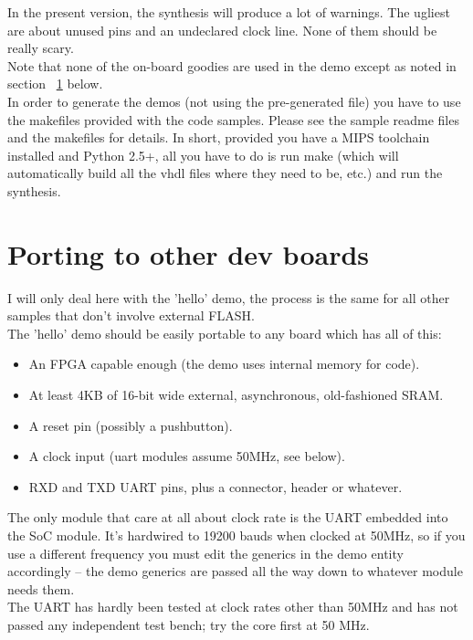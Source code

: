     In the present version, the synthesis will produce a lot of warnings. The 
    ugliest are about unused pins and an undeclared clock line. None of them 
    should be really scary.\\

    Note that none of the on-board goodies are used in the demo except as noted
    in section ~\ref{porting_hw_demo} below.\\

    In order to generate the demos (not using the pre-generated file) you
    have to use the makefiles provided with the code samples. Please see 
    the sample readme files and the makefiles for details. In short, provided
    you have a MIPS toolchain installed and Python 2.5+, all you have to do
    is run make (which will automatically build all the vhdl files where they
    need to be, etc.) and run the synthesis.\\
    

\section{Porting to other dev boards}
\label{porting_hw_demo}

    I will only deal here with the 'hello' demo, the process is the same
    for all other samples that don't involve external FLASH.\\

    The 'hello' demo should be easily portable to any board which has all of 
    this:

    \begin{itemize}
    \item An FPGA capable enough (the demo uses internal memory for code).
    \item At least 4KB of 16-bit wide external, asynchronous, old-fashioned SRAM.
    \item A reset pin (possibly a pushbutton).
    \item A clock input (uart modules assume 50MHz, see below).
    \item RXD and TXD UART pins, plus a connector, header or whatever.
    \end{itemize}

    The only module that care at all about clock rate is the UART embedded into
    the SoC module. It's hardwired to 19200 bauds when clocked at 50MHz, so if you
    use a different frequency you must edit the generics in the demo entity
    accordingly -- the demo generics are passed all the way down to whatever
    module needs them.\\
    The UART has hardly been tested at clock rates other than 50MHz and has not 
    passed any independent test bench; try the core first at 50 MHz.\\


